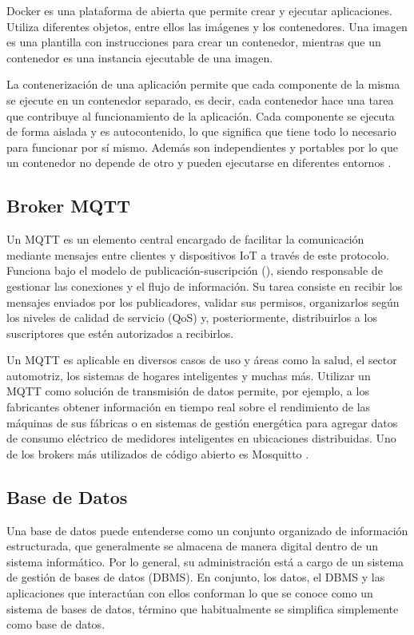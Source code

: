 Docker es una plataforma de  abierta que permite crear y ejecutar aplicaciones. Utiliza diferentes objetos, entre ellos las imágenes y los contenedores. Una imagen es una plantilla con instrucciones para crear un contenedor, mientras que un contenedor es una instancia ejecutable de una imagen.

La contenerización de una aplicación permite que cada componente de la misma se ejecute en un contenedor separado, es decir, cada contenedor hace una tarea que contribuye al funcionamiento de la aplicación. Cada componente se ejecuta de forma aislada y es autocontenido, lo que significa que tiene todo lo necesario para funcionar por sí mismo. Además son independientes y portables por lo que un contenedor no depende de otro y pueden ejecutarse en diferentes entornos \cite{docker_container_docs}. 


\subsection{Broker MQTT}

Un  MQTT es un elemento central encargado de facilitar la comunicación mediante mensajes entre clientes y dispositivos IoT a través de este protocolo. Funciona bajo el modelo de publicación-suscripción (), siendo responsable de gestionar las conexiones y el flujo de información. Su tarea consiste en recibir los mensajes enviados por los publicadores, validar sus permisos, organizarlos según los niveles de calidad de servicio (QoS) y, posteriormente, distribuirlos a los suscriptores que estén autorizados a recibirlos.

Un  MQTT es aplicable en diversos casos de uso y áreas como la salud, el sector automotriz, los sistemas de hogares inteligentes y muchas más. Utilizar un  MQTT como solución de transmisión de datos permite, por ejemplo, a los fabricantes obtener información en tiempo real sobre el rendimiento de las máquinas de sus fábricas o en sistemas de gestión energética para agregar datos de consumo eléctrico de medidores inteligentes en ubicaciones distribuidas. Uno de los brokers más utilizados de código abierto es Mosquitto \cite{mosquitto_homepage}.

\subsection{Base de Datos}
Una base de datos puede entenderse como un conjunto organizado de información estructurada, que generalmente se almacena de manera digital dentro de un sistema informático. Por lo general, su administración está a cargo de un sistema de gestión de bases de datos (DBMS). En conjunto, los datos, el DBMS y las aplicaciones que interactúan con ellos conforman lo que se conoce como un sistema de bases de datos, término que habitualmente se simplifica simplemente como base de datos.

